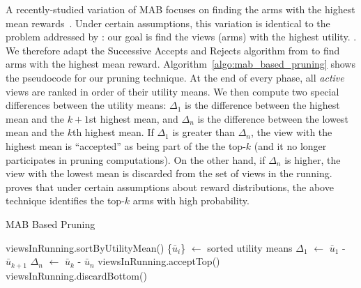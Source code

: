A recently-studied variation of MAB focuses on finding the arms with the highest
mean rewards~\cite{BubeckWV13, audibert2010best}.
Under certain assumptions, this variation is identical to the problem addressed by \SeeDB: our goal is find the views (arms) with the 
highest utility. .
We therefore adapt the Successive Accepts and Rejects algorithm from \cite{BubeckWV13} 
to find arms with the highest mean reward. 
Algorithm~\ref{algo:mab_based_pruning} shows the pseudocode for our pruning technique.
At the end of every phase, all {\it active} views are ranked in order of their utility means. 
We then compute two special differences between the utility means: $\Delta_1$
is the difference between the highest mean and the $k+1$st highest mean, and
$\Delta_n$ is the difference between the lowest mean and the $k$th highest mean.
If $\Delta_1$ is greater than $\Delta_n$, the view with the highest mean is
``accepted'' as being part of the the top-$k$ (and it no longer participates
in pruning computations).
On the other hand, if $\Delta_n$ is higher, the view with the lowest mean is discarded
from the set of views in the running.
\cite{BubeckWV13} proves that under certain assumptions about reward distributions,
the above technique identifies the top-$k$ arms with high probability.


\begin{algorithm}
\caption{MAB Based Pruning}
\label{algo:mab_based_pruning}
\begin{algorithmic}[1]
\State viewsInRunning.sortByUtilityMean()
\State \{$\bar{u}_{i}$\} $\gets$ sorted utility means
\State $\Delta_1$ $\gets$ $\bar{u}_{1}$ - $\bar{u}_{k+1}$
\State $\Delta_n$ $\gets$ $\bar{u}_{k}$ - $\bar{u}_{n}$
\State viewsInRunning.acceptTop()
\Else
\State viewsInRunning.discardBottom()
\EndIf
\end{algorithmic}
\end{algorithm}


